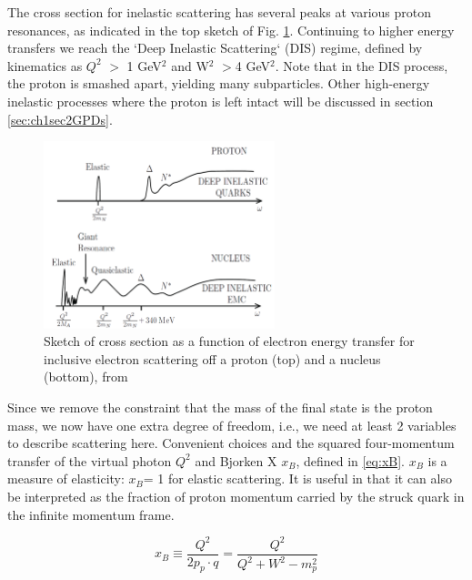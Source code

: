         The cross section for inelastic scattering has several peaks at various proton resonances, as indicated in the top sketch of Fig. \ref{fig:ScatteringvsW}. Continuing to higher energy transfers we reach the `Deep Inelastic Scattering` (DIS) regime, defined by kinematics as $Q^2$ $>$ 1 GeV$^2$ and W$^2$ $>$4 GeV$^2$. Note that in the DIS process, the proton is smashed apart, yielding many subparticles. Other high-energy inelastic processes where the proton is left intact will be discussed in section \ref{sec:ch1sec2GPDs}. 

        \begin{figure}[ht]
            \centering
            \includegraphics[width=0.6\textwidth]{Chapters/Ch1-Intro/Ch1-Sec1-Background/pics/intro/scatcrosstheory.png}
            \caption[Scattering Cross Section vs. Energy Transfer]{Sketch of cross section as a function of electron energy transfer for inclusive electron scattering off a proton (top) and a nucleus (bottom), from \parencite{Donnelly2017FoundationsPhysics} }
            \label{fig:ScatteringvsW}
        \end{figure}


        Since we remove the constraint that the mass of the final state is the proton mass, we now have one extra degree of freedom, i.e., we need at least 2 variables to describe scattering here. Convenient choices and the squared four-momentum transfer of the virtual photon $Q^2$ and Bjorken X $x_B$, defined in \eqref{eq:xB}. $x_B$ is a measure of elasticity: $x_B$= 1 for elastic scattering. It is useful in that it can also be interpreted as the fraction of proton momentum carried by the struck quark in the infinite momentum frame.       %

        \begin{equation}\label{eq:xB}
            x_B \equiv \frac{Q^2}{2p_p\cdot q} = \frac{Q^2}{Q^2+W^2-m_p^2}
        \end{equation}


